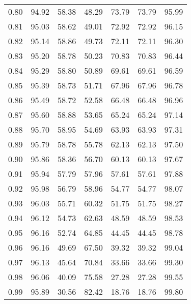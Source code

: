 \begin{tabular}{|c|c|c|c|c|c|c|}
      0.80 &     94.92 &     58.38 &      48.29 &   73.79 &      73.79 &         95.99 \\
      0.81 &     95.03 &     58.62 &      49.01 &   72.92 &      72.92 &         96.15 \\
      0.82 &     95.14 &     58.86 &      49.73 &   72.11 &      72.11 &         96.30 \\
      0.83 &     95.20 &     58.78 &      50.23 &   70.83 &      70.83 &         96.44 \\
      0.84 &     95.29 &     58.80 &      50.89 &   69.61 &      69.61 &         96.59 \\
      0.85 &     95.39 &     58.73 &      51.71 &   67.96 &      67.96 &         96.78 \\
      0.86 &     95.49 &     58.72 &      52.58 &   66.48 &      66.48 &         96.96 \\
      0.87 &     95.60 &     58.88 &      53.65 &   65.24 &      65.24 &         97.14 \\
      0.88 &     95.70 &     58.95 &      54.69 &   63.93 &      63.93 &         97.31 \\
      0.89 &     95.79 &     58.78 &      55.78 &   62.13 &      62.13 &         97.50 \\
      0.90 &     95.86 &     58.36 &      56.70 &   60.13 &      60.13 &         97.67 \\
      0.91 &     95.94 &     57.79 &      57.96 &   57.61 &      57.61 &         97.88 \\
      0.92 &     95.98 &     56.79 &      58.96 &   54.77 &      54.77 &         98.07 \\
      0.93 &     96.03 &     55.71 &      60.32 &   51.75 &      51.75 &         98.27 \\
      0.94 &     96.12 &     54.73 &      62.63 &   48.59 &      48.59 &         98.53 \\
      0.95 &     96.16 &     52.74 &      64.85 &   44.45 &      44.45 &         98.78 \\
      0.96 &     96.16 &     49.69 &      67.50 &   39.32 &      39.32 &         99.04 \\
      0.97 &     96.13 &     45.64 &      70.84 &   33.66 &      33.66 &         99.30 \\
      0.98 &     96.06 &     40.09 &      75.58 &   27.28 &      27.28 &         99.55 \\
      0.99 &     95.89 &     30.56 &      82.42 &   18.76 &      18.76 &         99.80 \\
\bottomrule
\end{tabular}
